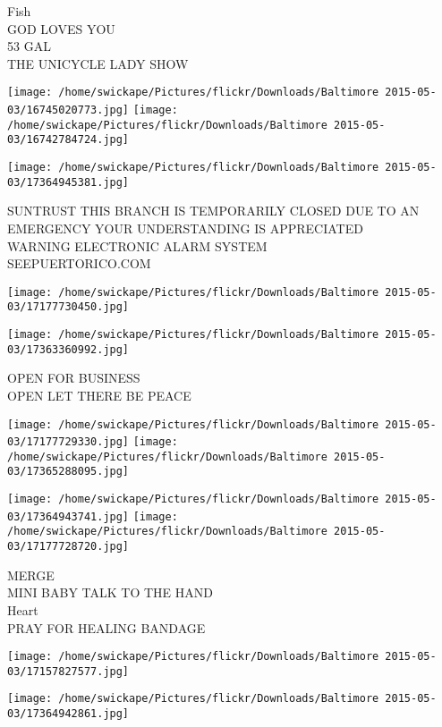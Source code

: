 \documentclass[10pt,letterpaper]{article}
\begin{document}
Fish\\
GOD LOVES YOU\\
53 GAL\\
THE UNICYCLE LADY SHOW\\
\pagebreak

\texttt{[image: /home/swickape/Pictures/flickr/Downloads/Baltimore 2015-05-03/16745020773.jpg]}
\texttt{[image: /home/swickape/Pictures/flickr/Downloads/Baltimore 2015-05-03/16742784724.jpg]}

\texttt{[image: /home/swickape/Pictures/flickr/Downloads/Baltimore 2015-05-03/17364945381.jpg]}

SUNTRUST THIS BRANCH IS TEMPORARILY CLOSED DUE TO AN EMERGENCY YOUR UNDERSTANDING IS APPRECIATED\\
WARNING ELECTRONIC ALARM SYSTEM\\
SEEPUERTORICO.COM\\
\pagebreak

\texttt{[image: /home/swickape/Pictures/flickr/Downloads/Baltimore 2015-05-03/17177730450.jpg]}

\vspace{0.25in}
\texttt{[image: /home/swickape/Pictures/flickr/Downloads/Baltimore 2015-05-03/17363360992.jpg]}

OPEN FOR BUSINESS\\
OPEN LET THERE BE PEACE\\
\pagebreak

\texttt{[image: /home/swickape/Pictures/flickr/Downloads/Baltimore 2015-05-03/17177729330.jpg]}
\texttt{[image: /home/swickape/Pictures/flickr/Downloads/Baltimore 2015-05-03/17365288095.jpg]}

\texttt{[image: /home/swickape/Pictures/flickr/Downloads/Baltimore 2015-05-03/17364943741.jpg]}
\texttt{[image: /home/swickape/Pictures/flickr/Downloads/Baltimore 2015-05-03/17177728720.jpg]}

MERGE\\
MINI BABY TALK TO THE HAND\\
Heart\\
PRAY FOR HEALING BANDAGE\\
\pagebreak

\texttt{[image: /home/swickape/Pictures/flickr/Downloads/Baltimore 2015-05-03/17157827577.jpg]}

\vspace{0.25in}
\texttt{[image: /home/swickape/Pictures/flickr/Downloads/Baltimore 2015-05-03/17364942861.jpg]}
\end{document}
